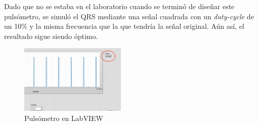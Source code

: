 \documentclass[conference]{IEEEtran}
\begin{document}
Dado que no se estaba en el laboratorio cuando se terminó de diseñar este pulsómetro, se simuló el QRS mediante una señal cuadrada con un \textit{duty-cycle} de un 10\% y la misma frecuencia que la que tendría la señal original. Aún así, el resultado sigue siendo óptimo.
\begin{figure}[H]
    \centerline{\includegraphics[width=0.45\textwidth]{e_pulsometro.png}}
    \caption{Pulsómetro en LabVIEW}
    \end{figure}
\end{document}
